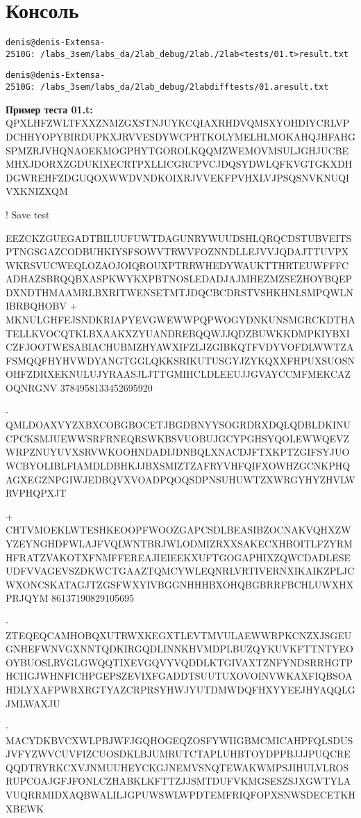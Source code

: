 \pagebreak

\section{Консоль}
\begin{alltt}
denis@denis-Extensa-2510G:~/labs_3sem/labs_da/2lab_debug/2lab ./2lab < tests/01.t > result.txt

denis@denis-Extensa-2510G:~/labs_3sem/labs_da/2lab_debug/2lab diff tests/01.a result.txt 
\end{alltt}

\textbf{Пример теста 01.t:}
QPXLHFZWLTFXXZNMZGXSTNJUYKCQIAXRHDVQMSXYOHDIYCRLVPDCHHYOPYBIRDUPKXJRVVESDYWCPHTKOLYMELHLMOKAHQJHFAHGSPMZRJVHQNAOEKMOGPHYTGOROLKQQMZWEMOVMSULJGHJUCBEMHXJDORXZGDUKIXECRTPXLLICGRCPVCJDQSYDWLQFKVGTGKXDHDGWREHFZDGUQOXWWDVNDKOIXRJVVEKFPVHXLVJPSQSNVKNUQIVXKNIZXQM

! Save test

EEZCKZGUEGADTBILUUFUWTDAGUNRYWUUDSHLQRQCDSTUBVEITSPTNGSGAZCODBUHKIYSFSOWVTRWVFOZNNDLLEJVVJQDAJTTUVPXWKRSVUCWEQLOZAOJOIQROUXPTRRWHEDYWAUKTTHRTEUWFFFCADHAZSBRQQBXASPKWYKXPBTNOSLEDADJAJMHEZMZSEZHOYBQEPDXNDTHMAAMRLBXRITWENSETMTJDQCBCDRSTVSHKHNLSMPQWLNIBRBQHOBV
+ MKNULGHFEJSNDKRIAPYEVGWEWWPQPWOGYDNKUNSMGRCKDTHATELLKVOCQTKLBXAAKXZYUANDREBQQWJJQDZBUWKKDMPKIYBXICZFJOOTWESABIACHUBMZHYAWXIFZLJZGIBKQTFVDYVOFDLWWTZAFSMQQFHYHVWDYANGTGGLQKKSRIKUTUSGYJZYKQXXFHPUXSUOSNOHFZDRXEKNULUJYRAASJLJTTGMIHCLDLEEUJJGVAYCCMFMEKCAZOQNRGNV 3784958133452695920

- QMLDOAXVYZXBXCOBGBOCETJBGDBNYYSOGRDRXDQLQDBLDKINUCPCKSMJUEWWSRFRNEQRSWKBSVUOBUJGCYPGHSYQOLEWWQEVZWRPZNUYUVXSRVWKOOHNDADIJDNBQLXNACDJFTXKPTZGIFSYJUOWCBYOLIBLFIAMDLDBHKJJBXSMIZTZAFRYVHFQIFXOWHZGCNKPHQAGXEGZNPGIWJEDBQVXVOADPQOQSDPNSUHUWTZXWRGYHYZHVLWRVPHQPXJT

+ CHTVMOEKLWTESHKEOOPFWOOZGAPCSDLBEASIBZOCNAKVQHXZWYZEYNGHDFWLAJFVQLWNTBRJWLODMIZRXXSAKECXHBOITLFZYRMHFRATZVAKOTXFNMFFEREAJIEIEEKXUFTGOGAPHIXZQWCDADLESEUDFVVAGEVSZDKWCTGAAZTQMCYWLEQNRLVRTIVERNXIKAIKZPLJCWXONCSKATAGJTZGSFWXYIVBGGNHHHBXOHQBGBRRFBCHLUWXHXPRJQYM 86137190829105695

- ZTEQEQCAMHOBQXUTRWXKEGXTLEVTMVULAEWWRPKCNZXJSGEUGNHEFWNVGXNNTQDKIRGQDLINNKHVMDPLBUZQYKUVKFTTNTYEOOYBUOSLRVGLGWQQTIXEVGQVYVQDDLKTGIVAXTZNFYNDSRRHGTPHCIIGJWHNFICHPGEPSZEVIXFGADDTSUUTUXOVOINVWKAXFIQBSOAHDLYXAFPWRXRGTYAZCRPRSYHWJYUTDMWDQFHXYYEEJHYAQQLGJMLWAXJU

- MACYDKBVCXWLPBJWFJGQHOGEQZOSFYWIIGBMCMICAHPFQLSDUSJVFYZWVCUVFIZCUOSDKLBJUMRUTCTAPLUHBTOYDPPBJJJPUQCREQQDTRYRKCXVJNMUUHEYCKGJNEMVSNQTEWAKWMPSJIHULVLROSRUPCOAJGFJFONLCZHABKLKFTTZJJSMTDUFVKMGSESZSJXGWTYLAVUQRRMIDXAQBWALILJGPUWSWLWPDTEMFRIQFOPXSNWSDECETKHXBEWK

